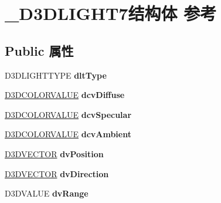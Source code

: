 \hypertarget{struct___d3_d_l_i_g_h_t7}{}\section{\+\_\+\+D3\+D\+L\+I\+G\+H\+T7结构体 参考}
\label{struct___d3_d_l_i_g_h_t7}
\subsection*{Public 属性}
\begin{DoxyCompactItemize}
\item 
\mbox{\label{struct___d3_d_l_i_g_h_t7_a6e4f4b140f68970b26e05cae49015221}} 
D3\+D\+L\+I\+G\+H\+T\+T\+Y\+PE {\bfseries dlt\+Type}
\item 
\mbox{\label{struct___d3_d_l_i_g_h_t7_a0d070c1981ed21e4c3ca2ecab7ded38f}} 
\hyperlink{struct___d3_d_c_o_l_o_r_v_a_l_u_e}{D3\+D\+C\+O\+L\+O\+R\+V\+A\+L\+UE} {\bfseries dcv\+Diffuse}
\item 
\mbox{\label{struct___d3_d_l_i_g_h_t7_a7f0a00cea00b55388821131f01285061}} 
\hyperlink{struct___d3_d_c_o_l_o_r_v_a_l_u_e}{D3\+D\+C\+O\+L\+O\+R\+V\+A\+L\+UE} {\bfseries dcv\+Specular}
\item 
\mbox{\label{struct___d3_d_l_i_g_h_t7_a1321410ad4641a756b54d513aa8d3a1b}} 
\hyperlink{struct___d3_d_c_o_l_o_r_v_a_l_u_e}{D3\+D\+C\+O\+L\+O\+R\+V\+A\+L\+UE} {\bfseries dcv\+Ambient}
\item 
\mbox{\label{struct___d3_d_l_i_g_h_t7_a4855403c39aee666af8c0d35bde29c44}} 
\hyperlink{struct___d3_d_v_e_c_t_o_r}{D3\+D\+V\+E\+C\+T\+OR} {\bfseries dv\+Position}
\item 
\mbox{\label{struct___d3_d_l_i_g_h_t7_ab7c59ed0d3ea1afde4e50f11e4b021bf}} 
\hyperlink{struct___d3_d_v_e_c_t_o_r}{D3\+D\+V\+E\+C\+T\+OR} {\bfseries dv\+Direction}
\item 
\mbox{\label{struct___d3_d_l_i_g_h_t7_a5648b7b3c4279ad23026c2e8fe054fd6}} 
D3\+D\+V\+A\+L\+UE {\bfseries dv\+Range}
\item 
\mbox{\label{struct___d3_d_l_i_g_h_t7_a0959339734001bc3d3cda6ea6a9a1d66}} 

\end{DoxyCompactItemize}
